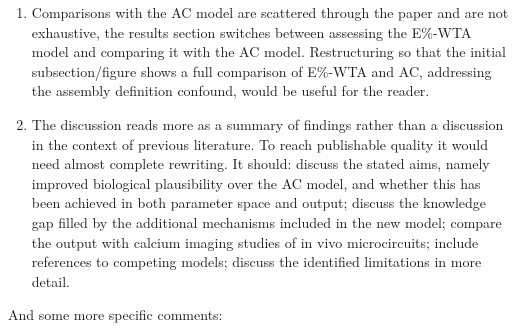 \documentclass[a4paper, 11pt]{article}
\begin{document}
\begin{enumerate}
    \item Comparisons with the AC model are scattered through the paper and are not exhaustive, the results section switches between assessing the E\%-WTA model and comparing it with the AC model. Restructuring so that the initial subsection/figure shows a full comparison of E\%-WTA and AC, addressing the assembly definition confound, would be useful for the reader.
    
    \item The discussion reads more as a summary of findings rather than a discussion in the context of previous literature. To reach publishable quality it would need almost complete rewriting. It should: discuss the stated aims, namely improved biological plausibility over the AC model, and whether this has been achieved in both parameter space and output; discuss the knowledge gap filled by the additional mechanisms included in the new model; compare the output with calcium imaging studies of in vivo microcircuits; include references to competing models; discuss the identified limitations in more detail.
\end{enumerate}

And some more specific comments:
\end{document}
